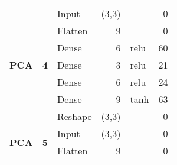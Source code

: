 \begin{table}[]
\begin{center}
\begin{tabular}{ll|l|r|l|r|}
\multicolumn{1}{|l|}{\multirow{7}{*}{\textbf{PCA}}} & \multirow{7}{*}{\textbf{4}} & Input                              & (3,3)                                &                                          & 0                                           \\ \cline{3-6} 
\multicolumn{1}{|l|}{}                              &                             & Flatten                            & 9                                    &                                          & 0                                           \\ \cline{3-6} 
\multicolumn{1}{|l|}{}                              &                             & Dense                              & 6                                    & relu                                     & 60                                          \\ \cline{3-6} 
\multicolumn{1}{|l|}{}                              &                             & Dense                              & 3                                    & relu                                     & 21                                          \\ \cline{3-6} 
\multicolumn{1}{|l|}{}                              &                             & Dense                              & 6                                    & relu                                     & 24                                          \\ \cline{3-6} 
\multicolumn{1}{|l|}{}                              &                             & Dense                              & 9                                    & tanh                                     & 63                                          \\ \cline{3-6} 
\multicolumn{1}{|l|}{}                              &                             & Reshape                            & (3,3)                                &                                          & 0                                           \\ \hline
\multicolumn{1}{|l|}{\multirow{7}{*}{\textbf{PCA}}} & \multirow{7}{*}{\textbf{5}} & Input                              & (3,3)                                &                                          & 0                                           \\ \cline{3-6} 
\multicolumn{1}{|l|}{}                              &                             & Flatten                            & 9                                    &                                          & 0                                           \\ \cline{3-6} 

\end{tabular}
\end{center}
\end{table}
